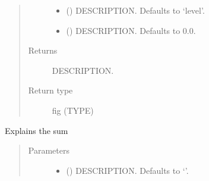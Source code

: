 \documentclass[letterpaper,10pt,english]{sphinxmanual}
\begin{document}
\begin{fulllineitems}
\begin{fulllineitems}
\begin{quote}
\begin{description}
\begin{itemize}
\item {} 
\sphinxAtStartPar
{} (\sphinxstyleliteralemphasis{\sphinxupquote{, }}) \textendash{} DESCRIPTION. Defaults to ‘level’.

\item {} 
\sphinxAtStartPar
{} (\sphinxstyleliteralemphasis{\sphinxupquote{, }}) \textendash{} DESCRIPTION. Defaults to 0.0.

\end{itemize}

\item[{Returns}] \leavevmode
\sphinxAtStartPar
DESCRIPTION.

\item[{Return type}] \leavevmode
\sphinxAtStartPar
fig (TYPE)

\end{description}\end{quote}

\end{fulllineitems}


\begin{fulllineitems}
\label{\detokenize{index:modeldekom.totdif.explain_sum}}
\pysigstartsignatures
{}
\pysigstopsignatures
\sphinxAtStartPar
Explains the sum
\begin{quote}\begin{description}
\item[{Parameters}] \leavevmode\begin{itemize}
\item {} 
\sphinxAtStartPar
{} (\sphinxstyleliteralemphasis{\sphinxupquote{, }}) \textendash{} DESCRIPTION. Defaults to ‘’.


\end{itemize}
\end{description}
\end{quote}
\end{fulllineitems}
\end{fulllineitems}
\end{document}
